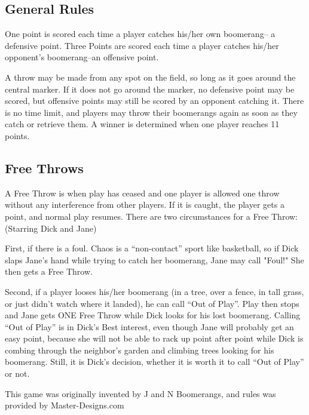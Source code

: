 \subsection*{General Rules}
One point is scored each time a player catches his/her own boomerang-- a defensive point. Three Points are scored each time a player catches his/her opponent's boomerang--an offensive point. 

A throw may be made from any spot on the field, so long as it goes around the central marker. If it does not go around the marker, no defensive point may be scored, but offensive points may still be scored by an opponent catching it. There is no time limit, and players may throw their boomerangs again as soon as they catch or retrieve them. A winner is determined when one player reaches 11 points. 

\subsection*{Free Throws}
A Free Throw is when play has ceased and one player is allowed one throw without any interference from other players. If it is caught, the player gets a point, and normal play resumes. There are two circumstances for a Free Throw: (Starring Dick and Jane)

First, if there is a foul. Chaos is a ``non-contact'' sport like basketball, so if Dick slaps Jane's hand while trying to catch her boomerang, Jane may call "Foul!" She then gets a Free Throw. 

Second, if a player looses his/her boomerang (in a tree, over a fence, in tall grass, or just didn't watch where it landed), he can call ``Out of Play''. Play then stops and Jane gets ONE Free Throw while Dick looks for his lost boomerang. Calling ``Out of Play'' is in Dick's Best interest, even though Jane will probably get an easy point, because she will not be able to rack up point after point while Dick is combing through the neighbor's garden and climbing trees looking for his boomerang. Still, it is Dick's decision, whether it is worth it to call ``Out of Play'' or not. 

This game was originally invented by J and N Boomerangs, and rules was provided by Master-Designs.com
